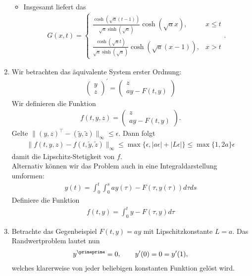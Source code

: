 \begin{solution}
\begin{enumerate}[label = \textbf{\alph*)}]
\begin{itemize}
    \item Insgesamt liefert das
    \begin{align*}
      G(x,t) = \begin{cases}
      \frac{\cosh(\sqrt{a}(t-1))}{\sqrt{a}\sinh(\sqrt{a})}\cosh(\sqrt{a}x), & x \leq t \\
      \frac{\cosh(\sqrt{a}t)}{\sqrt{a}\sinh(\sqrt{a})}\cosh(\sqrt{a}(x-1)), & x > t
      \end{cases}.
    \end{align*}
  \end{itemize}
  \item Wir betrachten das äquivalente System erster Ordnung:
  \begin{align*}
    \begin{pmatrix}
      y \\ z
    \end{pmatrix}^{\prime} =
    \begin{pmatrix}
      z \\ ay - F(t,y)
    \end{pmatrix}
  \end{align*}
  Wir definieren die Funktion
  \begin{align*}
    f(t,y,z) = \begin{pmatrix}
      z \\ ay - F(t,y)
    \end{pmatrix}.
  \end{align*}
  Gelte $\|(y,z)^{\top} - (\widetilde{y},\widetilde{z})\|_{\infty} \leq \epsilon$. Dann folgt
  \begin{align*}
    \|f(t,y,z) - f(t,\widetilde{y},\widetilde{z})\|_{\infty} \leq \max\{\epsilon, |a\epsilon| + |L\epsilon|\} \leq \max\{1,2a\}\epsilon
  \end{align*}
  damit die Lipschitz-Stetigkeit von $f$. \\
  Alternativ können wir das Problem auch in eine Integraldarstellung umformen:
  \begin{align*}
    y(t) = \int_0^t\int_0^say(\tau) - F(\tau,y(\tau))d\tau ds
  \end{align*}
  Definiere die Funktion
  \begin{align*}
    f(t,y) = \int_0^ty - F(\tau,y) d\tau
  \end{align*}
  \item Betrachte das Gegenbeispiel $F(t,y) = ay$ mit Lipschitzkonstante $L = a$. Das Randwertproblem lautet nun
  \begin{align*}
    y^{\primeprime} = 0, \qquad y^{\prime}(0) = 0 = y^{\prime}(1),
  \end{align*}
  welches klarerweise von jeder beliebigen konstanten Funktion gelöst wird.
\end{enumerate}
\end{solution}
